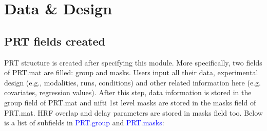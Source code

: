 



\section{Data \& Design}

\subsection{PRT fields created}

PRT structure is created after specifying this module. More specifically, two fields of PRT.mat are filled: group and masks. Users input all their data, experimental design (e.g., modalities, runs, conditions) and other related information here (e.g. covariates, regression values). After this step, data information is stored in the group field of PRT.mat and nifti 1st level masks are stored in the masks field of PRT.mat.  HRF overlap and delay parameters are stored in masks field too. Below is a list of subfields in \textcolor{blue}{PRT.group} and \textcolor{blue}{PRT.masks}:

